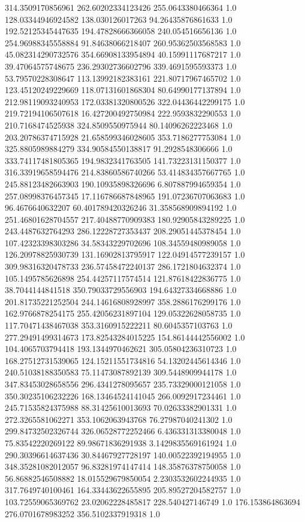314.3509170856961	262.60202334123426	255.0643380466364	1.0
128.03344946924582	138.030126017263	94.26435876861633	1.0
192.52125345447635	194.47828666366058	240.054516656136	1.0
254.96988345558884	91.84638066218407	260.95362503568583	1.0
45.082314290732576	354.66908133954894	40.15991117687217	1.0
39.47064575748675	236.29302736602796	339.4691595593373	1.0
53.79570228308647	113.13992182383161	221.80717967465702	1.0
123.45120249229669	118.07131601868304	80.64990177137894	1.0
212.98119093240953	172.03381320800526	322.04436442299175	1.0
219.72194106507618	16.427200492750984	222.9593832290553	1.0
210.7168474525938	324.8509550975944	80.14096262223468	1.0
203.20786374715928	21.658599346028605	353.7186277753084	1.0
325.8805989884279	334.90584550138817	91.2928548306666	1.0
333.74117481805365	194.9832341763505	141.73223131150377	1.0
316.33919658594476	214.83860586740266	53.414834357667765	1.0
245.88123482663903	190.10935898326696	6.807887994659354	1.0
257.08998376457345	17.116786687848965	191.07236707063683	1.0
96.4676640632207	60.401789420326246	31.358568909894192	1.0
251.46801628704557	217.40488770909383	180.92905843289225	1.0
243.4487632764293	286.12228727353437	208.29051445378454	1.0
107.42323398303286	34.58343229702696	108.34559480989058	1.0
126.20978825930739	131.16902813795917	122.04914577239157	1.0
309.98316320478733	236.57458472240137	286.1721804632374	1.0
105.1495785626898	254.44257117574514	121.87618422836775	1.0
38.7044144841518	350.79033729556903	194.64327334668886	1.0
201.81735221252504	244.14616808928997	358.2886176299176	1.0
162.9766878254175	255.42056231897104	129.05322628058735	1.0
117.70471438467038	353.3160915222211	80.6045357103763	1.0
277.29491499314673	173.82543284015225	154.86144442556002	1.0
104.4065703794418	193.1344970462621	305.05804236310723	1.0
168.27512731539065	124.15211551734816	54.13202445614346	1.0
240.51038188350583	75.11473087892139	309.5448909944178	1.0
347.83453028658556	296.4341278095657	235.73329000121058	1.0
350.30235106232226	168.13464524141045	266.0092917234461	1.0
245.71535824375988	88.31425610013693	70.02633382901331	1.0
272.3265581062271	353.1062063943768	76.27987040241302	1.0
299.84732502326744	326.06528772252466	6.436331313380048	1.0
75.83542220269122	89.98671836291938	3.1429835569161924	1.0
290.30396614637436	30.84467927728197	140.00522392194955	1.0
348.35281082012057	96.83281974147414	148.35876378750058	1.0
56.86882546508882	18.015529679850054	2.2303532602244935	1.0
317.7649740100461	164.33443622655895	205.89527204582757	1.0
103.72559065369762	23.02062228485817	228.540427146749	1.0
176.153864863694	276.0701678983252	356.5102337919318	1.0
